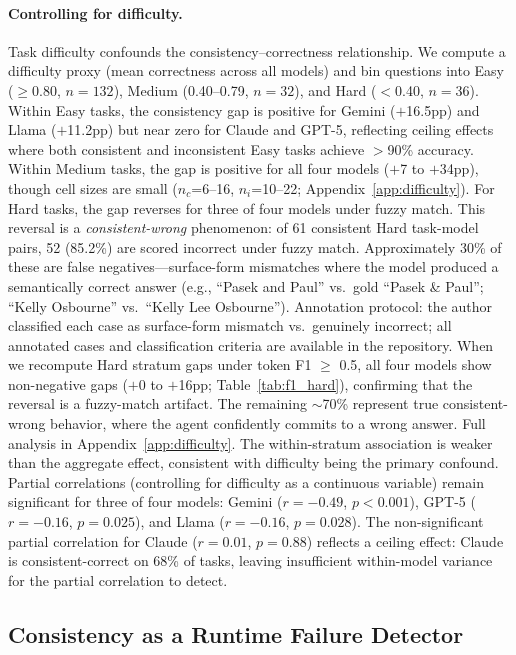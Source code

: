 \documentclass{article}
\begin{document}
\paragraph{Controlling for difficulty.} Task difficulty confounds the consistency--correctness relationship. We compute a difficulty proxy (mean correctness across all models) and bin questions into Easy ($\geq$0.80, $n=132$), Medium (0.40--0.79, $n=32$), and Hard ($<$0.40, $n=36$). Within Easy tasks, the consistency gap is positive for Gemini ($+$16.5pp) and Llama ($+$11.2pp) but near zero for Claude and GPT-5, reflecting ceiling effects where both consistent and inconsistent Easy tasks achieve $>$90\% accuracy. Within Medium tasks, the gap is positive for all four models ($+$7 to $+$34pp), though cell sizes are small ($n_c$=6--16, $n_i$=10--22; Appendix~\ref{app:difficulty}). For Hard tasks, the gap reverses for three of four models under fuzzy match. This reversal is a \emph{consistent-wrong} phenomenon: of 61 consistent Hard task-model pairs, 52 (85.2\%) are scored incorrect under fuzzy match. Approximately 30\% of these are false negatives---surface-form mismatches where the model produced a semantically correct answer (e.g., ``Pasek and Paul'' vs.\ gold ``Pasek \& Paul''; ``Kelly Osbourne'' vs.\ ``Kelly Lee Osbourne''). Annotation protocol: the author classified each case as surface-form mismatch vs.\ genuinely incorrect; all annotated cases and classification criteria are available in the repository. When we recompute Hard stratum gaps under token F1 $\geq$ 0.5, all four models show non-negative gaps ($+$0 to $+$16pp; Table~\ref{tab:f1_hard}), confirming that the reversal is a fuzzy-match artifact. The remaining $\sim$70\% represent true consistent-wrong behavior, where the agent confidently commits to a wrong answer. Full analysis in Appendix~\ref{app:difficulty}. The within-stratum association is weaker than the aggregate effect, consistent with difficulty being the primary confound. Partial correlations (controlling for difficulty as a continuous variable) remain significant for three of four models: Gemini ($r=-0.49$, $p<0.001$), GPT-5 ($r=-0.16$, $p=0.025$), and Llama ($r=-0.16$, $p=0.028$). The non-significant partial correlation for Claude ($r=0.01$, $p=0.88$) reflects a ceiling effect: Claude is consistent-correct on 68\% of tasks, leaving insufficient within-model variance for the partial correlation to detect.

\subsection{Consistency as a Runtime Failure Detector}
\label{sec:failure_detection}
\end{document}
